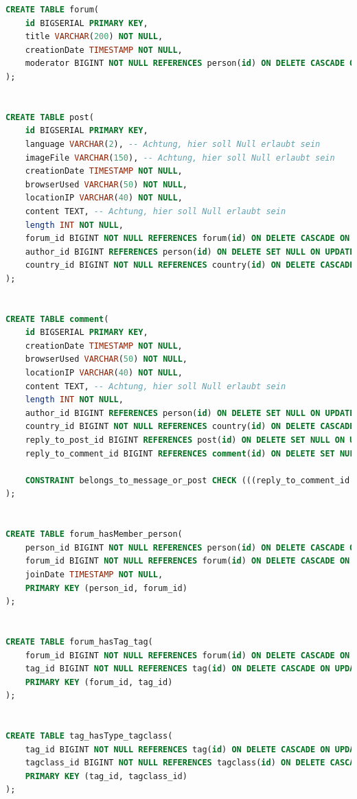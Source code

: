 \begin{lstlisting}[language=sql]
CREATE TABLE forum(
    id BIGSERIAL PRIMARY KEY,
    title VARCHAR(200) NOT NULL,
    creationDate TIMESTAMP NOT NULL,
    moderator BIGINT NOT NULL REFERENCES person(id) ON DELETE CASCADE ON UPDATE CASCADE
);


CREATE TABLE post(
    id BIGSERIAL PRIMARY KEY,
    language VARCHAR(2), -- Achtung, hier soll Null erlaubt sein
    imageFile VARCHAR(150), -- Achtung, hier soll Null erlaubt sein
    creationDate TIMESTAMP NOT NULL,
    browserUsed VARCHAR(50) NOT NULL,
    locationIP VARCHAR(40) NOT NULL,
    content TEXT, -- Achtung, hier soll Null erlaubt sein
    length INT NOT NULL,
    forum_id BIGINT NOT NULL REFERENCES forum(id) ON DELETE CASCADE ON UPDATE CASCADE,
    author_id BIGINT REFERENCES person(id) ON DELETE SET NULL ON UPDATE CASCADE,
    country_id BIGINT NOT NULL REFERENCES country(id) ON DELETE CASCADE ON UPDATE CASCADE
);


CREATE TABLE comment(
    id BIGSERIAL PRIMARY KEY,
    creationDate TIMESTAMP NOT NULL,
    browserUsed VARCHAR(50) NOT NULL,
    locationIP VARCHAR(40) NOT NULL,
    content TEXT, -- Achtung, hier soll Null erlaubt sein
    length INT NOT NULL,
    author_id BIGINT REFERENCES person(id) ON DELETE SET NULL ON UPDATE CASCADE,
    country_id BIGINT NOT NULL REFERENCES country(id) ON DELETE CASCADE ON UPDATE CASCADE,
    reply_to_post_id BIGINT REFERENCES post(id) ON DELETE SET NULL ON UPDATE CASCADE,
    reply_to_comment_id BIGINT REFERENCES comment(id) ON DELETE SET NULL ON UPDATE CASCADE,

    CONSTRAINT belongs_to_message_or_post CHECK (((reply_to_comment_id IS NOT NULL) AND (reply_to_post_id IS NULL)) OR ((reply_to_comment_id IS NULL) AND (reply_to_post_id IS NOT NULL)))
);


CREATE TABLE forum_hasMember_person(
    person_id BIGINT NOT NULL REFERENCES person(id) ON DELETE CASCADE ON UPDATE CASCADE,
    forum_id BIGINT NOT NULL REFERENCES forum(id) ON DELETE CASCADE ON UPDATE CASCADE,
    joinDate TIMESTAMP NOT NULL,
    PRIMARY KEY (person_id, forum_id)
);


CREATE TABLE forum_hasTag_tag(
    forum_id BIGINT NOT NULL REFERENCES forum(id) ON DELETE CASCADE ON UPDATE CASCADE,
    tag_id BIGINT NOT NULL REFERENCES tag(id) ON DELETE CASCADE ON UPDATE CASCADE,
    PRIMARY KEY (forum_id, tag_id)
);


CREATE TABLE tag_hasType_tagclass(
    tag_id BIGINT NOT NULL REFERENCES tag(id) ON DELETE CASCADE ON UPDATE CASCADE,
    tagclass_id BIGINT NOT NULL REFERENCES tagclass(id) ON DELETE CASCADE ON UPDATE CASCADE,
    PRIMARY KEY (tag_id, tagclass_id)
);



\end{lstlisting}
